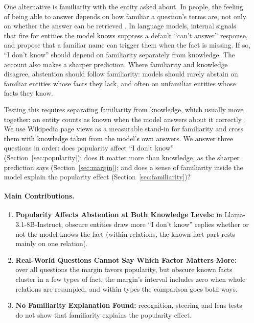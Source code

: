 \documentclass[letterpaper]{article} %
\newcommand{\idk}{``I don't know''}
\begin{document}
One alternative is familiarity with the entity asked about. In people, the feeling of being able to answer depends on how familiar a question's terms are, not only on whether the answer can be retrieved \citep{reder1992feeling,koriat2001combined}. In language models, internal signals that fire for entities the model knows suppress a default ``can't answer'' response, and \citet{lindsey2025biology} propose that a familiar name can trigger them when the fact is missing. If so, \idk{} should depend on familiarity separately from knowledge. The account also makes a sharper prediction. Where familiarity and knowledge disagree, abstention should follow familiarity: models should rarely abstain on familiar entities whose facts they lack, and often on unfamiliar entities whose facts they know.

Testing this requires separating familiarity from knowledge, which usually move together: an entity counts as known when the model answers about it correctly \citep{ferrando2025entity}. We use Wikipedia page views as a measurable stand-in for familiarity and cross them with knowledge taken from the model's own answers. We answer three questions in order: does popularity affect \idk{} (Section~\ref{sec:popularity}); does it matter more than knowledge, as the sharper prediction says (Section~\ref{sec:margin}); and does a sense of familiarity inside the model explain the popularity effect (Section~\ref{sec:familiarity})?

\paragraph{Main Contributions.}
\begin{enumerate}
\item \textbf{Popularity Affects Abstention at Both Knowledge Levels:} in Llama-3.1-8B-Instruct, obscure entities draw more \idk{} replies whether or not the model knows the fact (within relations, the known-fact part rests mainly on one relation).
\item \textbf{Real-World Questions Cannot Say Which Factor Matters More:} over all questions the margin favors popularity, but obscure known facts cluster in a few types of fact, the margin's interval includes zero when whole relations are resampled, and within types the comparison goes both ways.
\item \textbf{No Familiarity Explanation Found:} recognition, steering and lens tests do not show that familiarity explains the popularity effect.
\end{enumerate}
\end{document}
